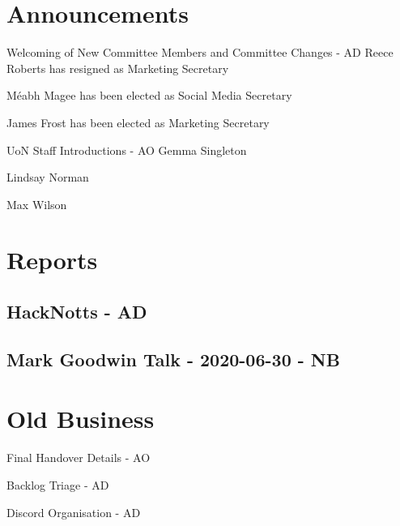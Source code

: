 \documentclass[11pt,hacksoc,agenda]{meetingmins}
\begin{document}
\maketitle

\section{Announcements }
\begin{items}
  \item
  Welcoming of New Committee Members and Committee Changes - AD
    \subitem
    Reece Roberts has resigned as Marketing Secretary

    \subitem
    M\'eabh Magee has been elected as Social Media Secretary

    \subitem
    James Frost has been elected as Marketing Secretary

  \item
  UoN Staff Introductions - AO
    \subitem
    Gemma Singleton

    \subitem
    Lindsay Norman

    \subitem
    Max Wilson
\end{items}

\section{Reports}

\subsection{HackNotts - AD}
\begin{hiddensubitems}
  \item
\end{hiddensubitems}

\subsection{Mark Goodwin Talk - 2020-06-30 - NB}
\begin{hiddensubitems}
  \item
\end{hiddensubitems}

\section{Old Business}
\begin{items}
  \item 
  Final Handover Details - AO

  \item 
  Backlog Triage - AD

  \item
  Discord Organisation - AD
\end{items}
\end{document}
